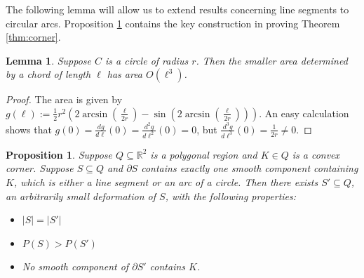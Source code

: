 \documentclass[leqno]{article}
\numberwithin{equation}{section}
\theoremstyle{definition}
\theoremstyle{remark}
\theoremstyle{plain}
\newtheorem{lemma}[equation]{Lemma}
\newtheorem{proposition}[equation]{Proposition}
\begin{document}
The following lemma will allow us to extend results concerning line segments to circular arcs.  Proposition \ref{prop:convexcorner} contains the key construction in proving Theorem \ref{thm:corner}.


\begin{lemma}\label{lem:chordAreaOrder}Suppose $C$ is a circle of radius $r$.  Then the smaller area determined by a chord of length $\ell$ has area  $O(\ell^3)$.
\end{lemma}

\begin{proof}
The area is given by $g(\ell):=\frac{1}{2} r^2 \left(2\arcsin\left(\frac{\ell}{2r}\right)-\sin\left(2\arcsin\left(\frac{\ell}{2r}\right)\right)\right)$.
 An easy calculation shows that $g(0)=\frac{dg}{d\ell}(0) = \frac{d^2 g}{d\ell^2}(0)= 0$, but $\frac{d^3g}{d\ell^3}(0) = \frac{1}{2r}\neq 0$.
\end{proof}







\begin{proposition}\label{prop:convexcorner}Suppose $Q\subseteq\mathbb{R}^2$ is a polygonal region and $K\in Q$ is a convex corner.  Suppose $S\subseteq Q$ and $\partial S$ contains exactly one smooth component containing $K$, which is either a line segment or an arc of a circle.  Then there exists $S' \subseteq Q$, an arbitrarily small deformation of $S$, with the following properties:

\begin{itemize}\item $|S| = |S'|$
\item $P(S) > P(S')$
\item No smooth component of $\partial S'$ contains $K$.
\end{itemize}

\end{proposition}
\end{document}
